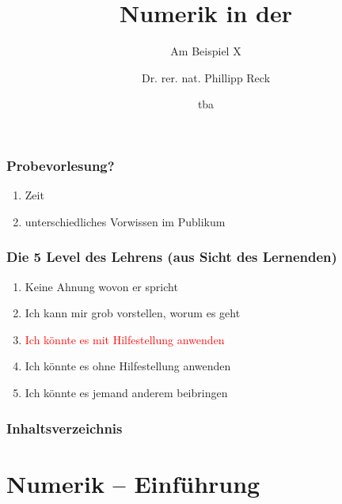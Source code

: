 \documentclass{beamer}
\begin{document}
\title{Numerik in der }
\subtitle{Am Beispiel X}
\author[Phillipp Reck]{Dr. rer. nat. Phillipp Reck}
\date{tba} 

\begin{frame}
\titlepage
\end{frame}



\begin{frame}\frametitle{Probevorlesung?}
    \pause
  \begin{enumerate}
    \item Zeit
    \item unterschiedliches Vorwissen im Publikum
  \end{enumerate}
  \end{frame} 

\begin{frame}
  \titlepage
  \end{frame}
  


\begin{frame}\frametitle{Die 5 Level des Lehrens (aus Sicht des Lernenden)}
    \pause
\begin{enumerate}
  \item  \glqq Keine Ahnung wovon er spricht\grqq\pause
  \item  \glqq Ich kann mir grob vorstellen, worum es geht\grqq\pause
  \item  \textcolor<7>{red}{\glqq Ich könnte es mit Hilfestellung anwenden\grqq}\pause
  \item  \glqq Ich könnte es ohne Hilfestellung anwenden\grqq\pause
  \item  \glqq Ich könnte es jemand anderem beibringen\grqq\pause
\end{enumerate}
\end{frame} 


\begin{frame}
  \frametitle{Inhaltsverzeichnis}\tableofcontents
  \end{frame} 

\section{Numerik -- Einführung}
\end{document}

